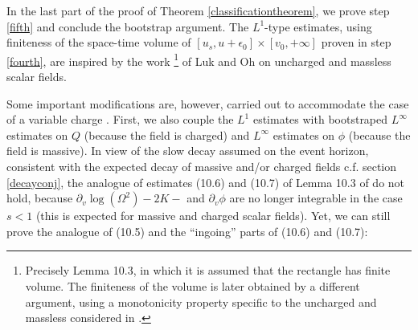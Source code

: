 \documentclass[10pt,a4paper]{article}
\theoremstyle{plain}
\theoremstyle{remark}
\theoremstyle{definition}
\theoremstyle{plain}
\theoremstyle{remark}
\theoremstyle{definition}
\numberwithin{equation}{section}
\begin{document}
In the last part of the proof of Theorem \ref{classificationtheorem}, we prove step \ref{fifth} and conclude the bootstrap argument. The $L^1$-type estimates, using finiteness of the space-time volume of $ [u_s,u+\epsilon_0] \times [v_0,+\infty]$ proven in step \ref{fourth}, are inspired by the work \footnote{Precisely Lemma 10.3, in which it is assumed that the rectangle has finite volume. The finiteness of the volume is later obtained by a different argument, using a monotonicity property specific to the uncharged and massless considered in \cite{JonathanStab}.} of Luk and Oh \cite{JonathanStab} on uncharged and massless scalar fields. 

Some important modifications are, however, carried out to accommodate the case of a variable charge . First, we also couple the $L^1$ estimates with bootstraped $L^{\infty}$ estimates on $Q$ (because the field is charged) and $L^{\infty}$ estimates on $\phi$ (because the field is massive). In view of the slow decay assumed on the event horizon, consistent with the expected decay of massive and/or charged fields c.f. section \ref{decayconj}, the analogue of estimates (10.6) and (10.7) of Lemma 10.3 of \cite{JonathanStab} do not hold, because $\partial_v \log(\Omega^2)-2K-$ and $\partial_v \phi$ are no longer integrable in the case $s<1$ (this is expected for massive and charged scalar fields). Yet, we can still prove the analogue of (10.5) and the ``ingoing'' parts of (10.6) and (10.7): 
\end{document}
